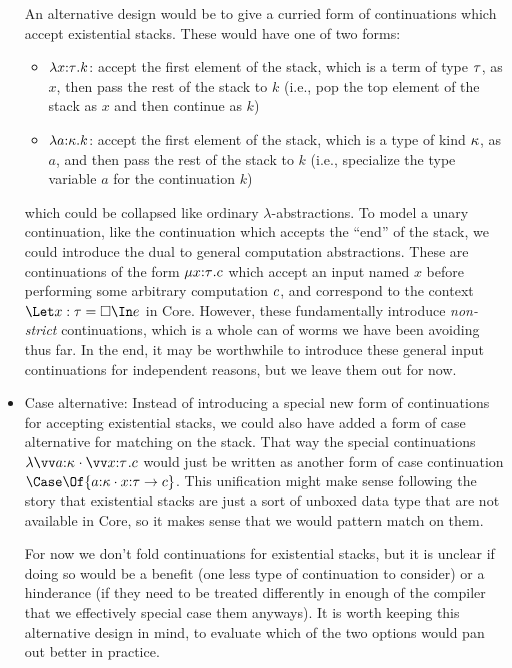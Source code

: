 \documentclass{article}
\begin{document}
\begin{itemize}
  An alternative design would be to give a curried form of continuations which
  accept existential stacks.  These would have one of two forms:
  \begin{itemize}
  \item $\lambda{x{:}{\tau}}.k$: accept the first element of the stack, which is a
    term of type $\tau$, as $x$, then pass the rest of the stack to $k$ (i.e.,
    pop the top element of the stack as $x$ and then continue as $k$)
  \item $\lambda{a{:}{\kappa}}.k$: accept the first element of the stack, which is a
    type of kind $\kappa$, as $a$, and then pass the rest of the stack to $k$
    (i.e., specialize the type variable $a$ for the continuation $k$)
  \end{itemize}
  which could be collapsed like ordinary $\lambda$-abstractions.  To model a
  unary continuation, like the continuation which accepts the ``end'' of the
  stack, we could introduce the dual to general computation abstractions.  These
  are continuations of the form $\mu{x{:}{\tau}}.c$ which accept an input
  named $x$ before performing some arbitrary computation $c$, and correspond
  to the context $\Let x:\ty = \hole \In \expr$ in Core.  However, these
  fundamentally introduce \emph{non-strict} continuations, which is a whole can
  of worms we have been avoiding thus far.  In the end, it may be worthwhile to
  introduce these general input continuations for independent reasons, but we
  leave them out for now.

\item Case alternative: Instead of introducing a special new form of
  continuations for accepting existential stacks, we could also have added a
  form of case alternative for matching on the stack.  That way the special
  continuations $\fnk{\packs{\vect{\ann a \ki}}{\vect{\ann x \ty}}}\cmd$ would
  just be written as another form of case continuation
  $\Case\Of{\packs{\ann a \ki}{\ann x \ty} \to \cmd}$.  This unification might
  make sense following the story that existential stacks are just a sort of
  unboxed data type that are not available in Core, so it makes sense that we
  would pattern match on them.

  For now we don't fold continuations for existential stacks, but it is unclear
  if doing so would be a benefit (one less type of continuation to consider) or
  a hinderance (if they need to be treated differently in enough of the compiler
  that we effectively special case them anyways).  It is worth keeping this
  alternative design in mind, to evaluate which of the two options would pan out
  better in practice.
\end{itemize}
\end{document}
